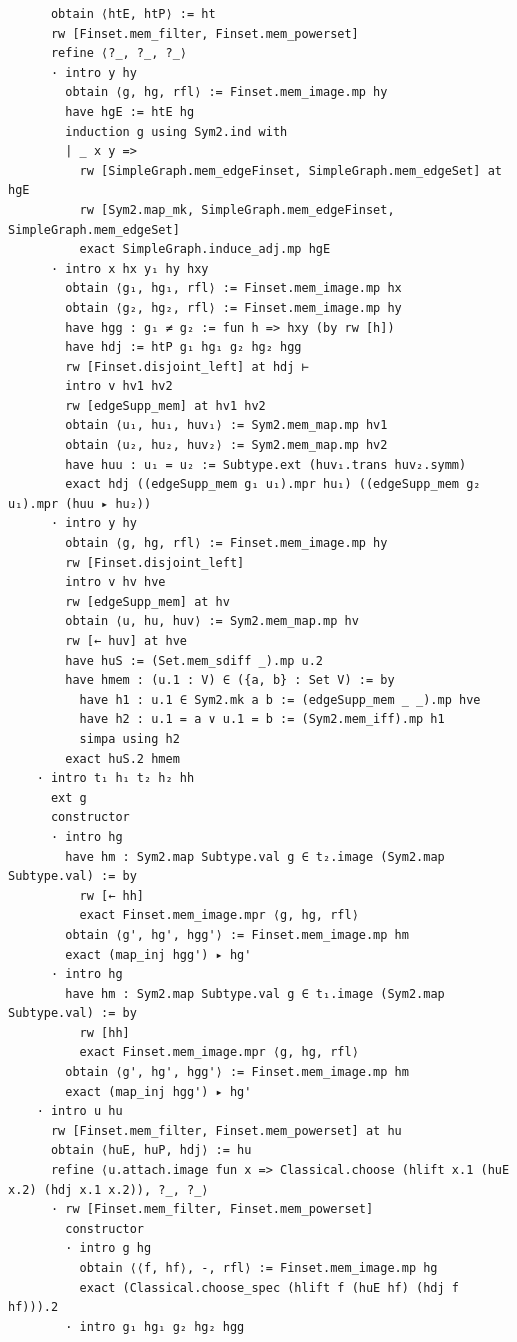 \documentclass[11pt]{article}
\theoremstyle{definition}
\begin{document}
\begin{lstlisting}
      obtain ⟨htE, htP⟩ := ht
      rw [Finset.mem_filter, Finset.mem_powerset]
      refine ⟨?_, ?_, ?_⟩
      · intro y hy
        obtain ⟨g, hg, rfl⟩ := Finset.mem_image.mp hy
        have hgE := htE hg
        induction g using Sym2.ind with
        | _ x y =>
          rw [SimpleGraph.mem_edgeFinset, SimpleGraph.mem_edgeSet] at hgE
          rw [Sym2.map_mk, SimpleGraph.mem_edgeFinset, SimpleGraph.mem_edgeSet]
          exact SimpleGraph.induce_adj.mp hgE
      · intro x hx y₁ hy hxy
        obtain ⟨g₁, hg₁, rfl⟩ := Finset.mem_image.mp hx
        obtain ⟨g₂, hg₂, rfl⟩ := Finset.mem_image.mp hy
        have hgg : g₁ ≠ g₂ := fun h => hxy (by rw [h])
        have hdj := htP g₁ hg₁ g₂ hg₂ hgg
        rw [Finset.disjoint_left] at hdj ⊢
        intro v hv1 hv2
        rw [edgeSupp_mem] at hv1 hv2
        obtain ⟨u₁, hu₁, huv₁⟩ := Sym2.mem_map.mp hv1
        obtain ⟨u₂, hu₂, huv₂⟩ := Sym2.mem_map.mp hv2
        have huu : u₁ = u₂ := Subtype.ext (huv₁.trans huv₂.symm)
        exact hdj ((edgeSupp_mem g₁ u₁).mpr hu₁) ((edgeSupp_mem g₂ u₁).mpr (huu ▸ hu₂))
      · intro y hy
        obtain ⟨g, hg, rfl⟩ := Finset.mem_image.mp hy
        rw [Finset.disjoint_left]
        intro v hv hve
        rw [edgeSupp_mem] at hv
        obtain ⟨u, hu, huv⟩ := Sym2.mem_map.mp hv
        rw [← huv] at hve
        have huS := (Set.mem_sdiff _).mp u.2
        have hmem : (u.1 : V) ∈ ({a, b} : Set V) := by
          have h1 : u.1 ∈ Sym2.mk a b := (edgeSupp_mem _ _).mp hve
          have h2 : u.1 = a ∨ u.1 = b := (Sym2.mem_iff).mp h1
          simpa using h2
        exact huS.2 hmem
    · intro t₁ h₁ t₂ h₂ hh
      ext g
      constructor
      · intro hg
        have hm : Sym2.map Subtype.val g ∈ t₂.image (Sym2.map Subtype.val) := by
          rw [← hh]
          exact Finset.mem_image.mpr ⟨g, hg, rfl⟩
        obtain ⟨g', hg', hgg'⟩ := Finset.mem_image.mp hm
        exact (map_inj hgg') ▸ hg'
      · intro hg
        have hm : Sym2.map Subtype.val g ∈ t₁.image (Sym2.map Subtype.val) := by
          rw [hh]
          exact Finset.mem_image.mpr ⟨g, hg, rfl⟩
        obtain ⟨g', hg', hgg'⟩ := Finset.mem_image.mp hm
        exact (map_inj hgg') ▸ hg'
    · intro u hu
      rw [Finset.mem_filter, Finset.mem_powerset] at hu
      obtain ⟨huE, huP, hdj⟩ := hu
      refine ⟨u.attach.image fun x => Classical.choose (hlift x.1 (huE x.2) (hdj x.1 x.2)), ?_, ?_⟩
      · rw [Finset.mem_filter, Finset.mem_powerset]
        constructor
        · intro g hg
          obtain ⟨⟨f, hf⟩, -, rfl⟩ := Finset.mem_image.mp hg
          exact (Classical.choose_spec (hlift f (huE hf) (hdj f hf))).2
        · intro g₁ hg₁ g₂ hg₂ hgg

\end{lstlisting}
\end{document}
